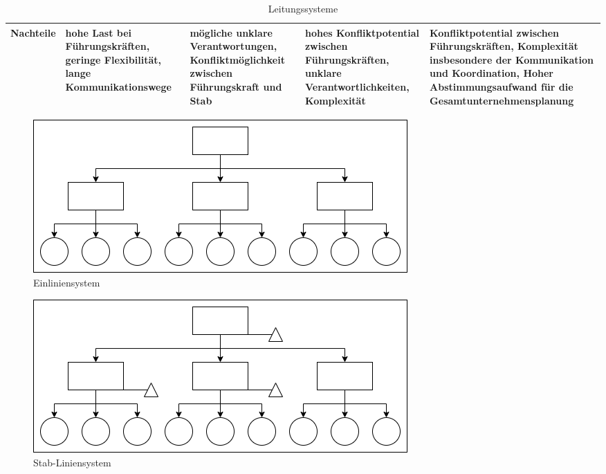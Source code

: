 \begin{table}[H]
\begin{tabularx}{\textwidth}{|c|X|X|X|X|}
        \hline
        Nachteile  & hohe Last bei Führungskräften, geringe Flexibilität, lange Kommunikationswege                                                                            & mögliche unklare Verantwortungen, Konfliktmöglichkeit zwischen Führungskraft und Stab                                             & hohes Konfliktpotential zwischen Führungskräften, unklare Verantwortlichkeiten, Komplexität                                                                                                                                                               & Konfliktpotential zwischen Führungskräften, Komplexität insbesondere der Kommunikation und Koordination, Hoher Abstimmungsaufwand für die Gesamtunternehmensplanung                                                                                                 \\
        \hline
    \end{tabularx}
    \caption{Leitungssysteme}
    \label{tab:leitungssysteme}
\end{table}


\begin{figure}[H]
    \centering
    \includegraphics[width=\textwidth]{figures/einliniensystem.png}
    \caption{Einliniensystem}
    \label{fig:einliniensystem}
\end{figure}
\FloatBarrier

\begin{figure}[H]
    \centering
    \includegraphics[width=\textwidth]{figures/stabliniensystem.png}
    \caption{Stab-Liniensystem}
    \label{fig:stabliniensystem}
\end{figure}
\FloatBarrier

